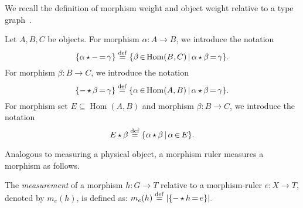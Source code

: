 We recall the definition of morphism weight and object weight relative to a type graph~\cite{endrullis2024generalized_icgt}.

\begin{notation}
Let \(A,B,C\) be objects. For morphism $\alpha\mathop{\colon} A \mathop{\to} B$, we introduce the notation 
          $$\{ \alpha \mathop{\star} - \mathop{=} \gamma \} \overset{\operatorname{def}}{=} \{ \beta \mathop{\in} \operatorname{Hom}(B, C) \mathop{\mid} \alpha \mathop{\star} \beta \mathop{=} \gamma \}.$$ 
For morphism $\beta\mathop{\colon} B \mathop{\to} C$, we introduce the notation
          $$\{ - \mathop{\star} \beta \mathop{=} \gamma \}  \overset{\operatorname{def}}{=} \{ \alpha \mathop{\in} \operatorname{Hom}(A, B) \mathop{\mid} \alpha \mathop{\star} \beta \mathop{=} \gamma \}.$$
For morphism set $E \mathop{\subseteq} \operatorname{Hom}(A,B)$ and morphism $\beta\mathop{\colon} B \mathop{\to} C$, we introduce the notation
          $$E \mathop{\star} \beta \overset{\operatorname{def}}{=} \{ \alpha \mathop{\star} \beta \mathop{\mid} \alpha \mathop{\in} E \}.$$
\end{notation}
Analogous to measuring a physical object, a morphism ruler measures a morphism as follows.
\begin{definition} 
    \label{def:measurement_of_a_morphism_relative_to_a_morphism_ruler}
    The \emph{measurement} of a morphism \( h:G \mathop{\to} T \) relative to a morphism-ruler \( e: X \mathop{\to} T \), denoted by $m_e(h)$, is defined as:
                \(
                m_e(h) 
                    \overset{\operatorname{def}}{=}
                |\{- \mathop{\star} h \mathop{=} e\}|.
                \)
\end{definition}


